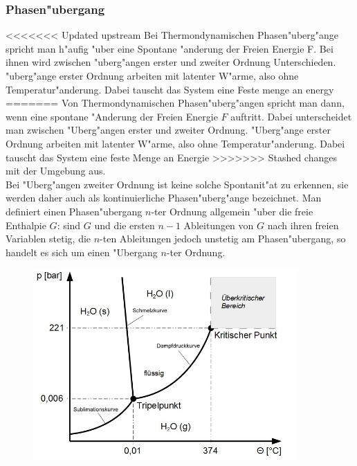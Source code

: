         \subsubsection*{Phasen"ubergang}
<<<<<<< Updated upstream
            Bei Thermondynamischen Phasen"uberg"ange spricht man h"aufig "uber eine Spontane "anderung der Freien Energie F.
            Bei ihnen wird zwischen "uberg"angen erster und zweiter Ordnung Unterschieden. "uberg"ange erster Ordnung
            arbeiten mit latenter W"arme, also ohne Temperatur"anderung. Dabei tauscht das System eine Feste menge an energy
=======
            Von Thermondynamischen Phasen"uberg"angen spricht man dann, wenn eine spontane "Anderung der Freien Energie $F$ auftritt.
            Dabei unterscheidet man zwischen "Uberg"angen erster und zweiter Ordnung. "Uberg"ange erster Ordnung
            arbeiten mit latenter W"arme, also ohne Temperatur"anderung. Dabei tauscht das System eine feste Menge an Energie
>>>>>>> Stashed changes
            mit der Umgebung aus.\\
            Bei "Uberg"angen zweiter Ordnung ist keine solche Spontanit"at zu erkennen, sie werden daher auch als kontinuierliche Phasen"uberg"ange bezeichnet. Man definiert einen Phasen"ubergang $n$-ter Ordnung allgemein "uber die freie Enthalpie $G$: sind $G$ und die ersten $n-1$ Ableitungen von $G$ nach ihren freien Variablen stetig, die $n$-ten Ableitungen jedoch unstetig am Phasen"ubergang, so handelt es sich um einen "Ubergang $n$-ter Ordnung.
            \begin{figure}[H]
                \centering
                \includegraphics[width=0.9\textwidth]{Images/waterphase.jpg}
            \end{figure}
